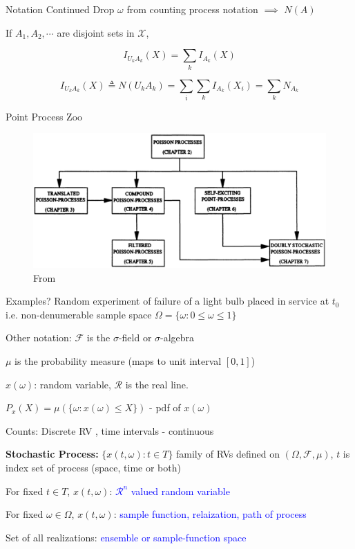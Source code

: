\documentclass{beamer}
\newcommand{\CF}{\mathcal{F}}
\newcommand{\CR}{\mathcal{R}}
\begin{document}
\begin{frame}{Notation Continued}
    Drop $\omega$ from counting process notation $\implies$ $N(A)$

    If $A_1, A_2, \cdots$ are disjoint sets in $\mathcal{X}$, 


    $$I_{U_k A_k}(X) = \sum_{k}I_{A_k}(X)$$

    $$I_{U_k A_k}(X) \triangleq N(U_k A_k) = \sum_{i} \sum_{k} I_{A_k}(X_i) = \sum_{k} N_{A_k}$$
\end{frame}

\begin{frame}{Point Process Zoo}
    \begin{figure}
        \centering
        \includegraphics[width=0.8\linewidth]{slides_20231201//figures/pt_process_types.png}
        \caption{From \cite{Snyder_1991}}
        \label{fig:pt_pcs}
    \end{figure}
\end{frame}


\begin{frame}{Examples?}
    Random experiment of failure of a light bulb placed in service at $t_0$ i.e. non-denumerable sample space $\Omega = \{\omega: 0 \leq \omega \leq 1\}$

    Other notation: 
    $\CF$ is the $\sigma$-field or $\sigma$-algebra

    $\mu$ is the probability measure (maps to unit interval $[0, 1]$)

    $x(\omega)$: random variable, $\CR$ is the real line.

    $P_x(X) = \mu(\{\omega: x(\omega) \leq X\})$ - pdf of $x(\omega)$

    Counts: Discrete RV , time intervals - continuous

    \textbf{Stochastic Process:} $\{x(t, \omega): t \in T\}$ family of RVs defined on $(\Omega, \CF, \mu)$, $t$ is index set of process (space, time or both)

    For fixed $t \in T$, $x(t, \omega)$: \textcolor{blue}{$\CR^n$ valued random variable}

    For fixed $\omega \in \Omega$, $x(t, \omega)$: \textcolor{blue}{sample function, relaization, path of process}

    Set of all realizations: \textcolor{blue}{ensemble or sample-function space}
\end{frame}
\end{document}
